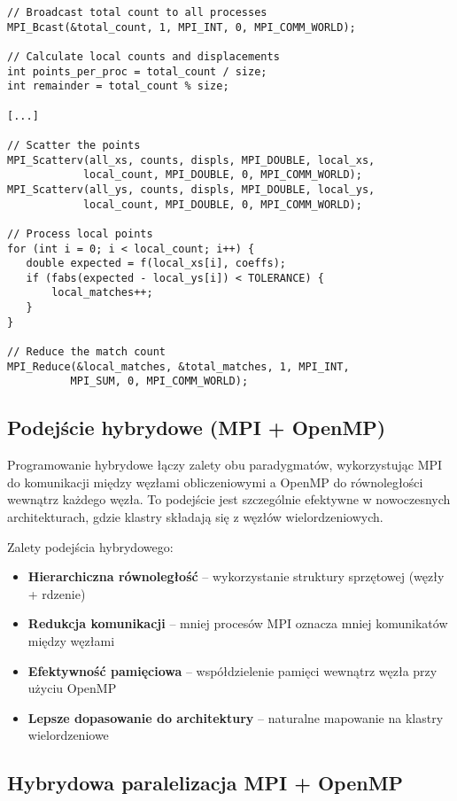 \documentclass[12pt,a4paper]{report}
\begin{document}
\begin{verbatim}
// Broadcast total count to all processes
MPI_Bcast(&total_count, 1, MPI_INT, 0, MPI_COMM_WORLD);

// Calculate local counts and displacements
int points_per_proc = total_count / size;
int remainder = total_count % size;

[...]

// Scatter the points
MPI_Scatterv(all_xs, counts, displs, MPI_DOUBLE, local_xs, 
            local_count, MPI_DOUBLE, 0, MPI_COMM_WORLD);
MPI_Scatterv(all_ys, counts, displs, MPI_DOUBLE, local_ys, 
            local_count, MPI_DOUBLE, 0, MPI_COMM_WORLD);

// Process local points
for (int i = 0; i < local_count; i++) {
   double expected = f(local_xs[i], coeffs);
   if (fabs(expected - local_ys[i]) < TOLERANCE) {
       local_matches++;
   }
}

// Reduce the match count
MPI_Reduce(&local_matches, &total_matches, 1, MPI_INT, 
          MPI_SUM, 0, MPI_COMM_WORLD);
\end{verbatim}

\subsection{Podejście hybrydowe (MPI + OpenMP)}

Programowanie hybrydowe łączy zalety obu paradygmatów, wykorzystując MPI do komunikacji między węzłami obliczeniowymi a OpenMP do równoległości wewnątrz każdego węzła. To podejście jest szczególnie efektywne w nowoczesnych architekturach, gdzie klastry składają się z węzłów wielordzeniowych.

Zalety podejścia hybrydowego:
\begin{itemize}
    \item \textbf{Hierarchiczna równoległość} -- wykorzystanie struktury sprzętowej (węzły + rdzenie)
    \item \textbf{Redukcja komunikacji} -- mniej procesów MPI oznacza mniej komunikatów między węzłami
    \item \textbf{Efektywność pamięciowa} -- współdzielenie pamięci wewnątrz węzła przy użyciu OpenMP
    \item \textbf{Lepsze dopasowanie do architektury} -- naturalne mapowanie na klastry wielordzeniowe
\end{itemize}

\subsection{Hybrydowa paralelizacja MPI + OpenMP}
\end{document}
